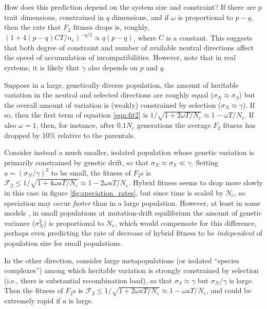 \documentclass{article}
\newcommand{\plr}[1]{\todo[color=blue!25]{#1}}
\newcommand{\plr}[1]{{\color{blue}\it #1}}
\newcommand{\1}{\mathbbm{1}}
\newcommand{\fit}{\mathcal{F}}
\begin{document}
How does this prediction depend on the system size and constraint?
If there are $p$ trait dimensions, constrained in $q$ dimensions,
and if $\omega$ is proportional to $p-q$,
then the rate that $F_2$ fitness drops is, roughly,
$(1 + 4 (p-q) C T/n_e)^{-q/2} \propto q (p-q)$, where $C$ is a constant.
This suggests that both degree of constraint and number of available neutral directions
affect the speed of accumulation of incompatibilities.
However, note that in real systems, it is likely that $\gamma$ also depends on $p$ and $q$.
\plr{revisit with sims}

Suppose in a large, genetically diverse population,
the amount of heritable variation in the neutral and selected directions are roughly equal 
($\sigma_N \approx \sigma_S$)
but the overall amount of variation is (weakly) constrained by selection
($\sigma_N \approx \gamma$).
If so, then the first term of equation \eqref{eqn:fit2} is
$1/\sqrt{1 + 2 \omega T/N_e} \approx 1 - \omega T/N_e$.
If also $\omega=1$, then, for instance, after $0.1 N_e$ generations
the average $F_2$ fitness has dropped by 10\% relative to the parentals.

Consider instead a much smaller, isolated population
whose genetic variation is primarily constrained by genetic drift,
so that $\sigma_N \approx \sigma_S \ll \gamma$.
Setting $a = (\sigma_N/\gamma)^2$ to be small,
the fitness of $F_2$s is $\fit_2 \le 1/\sqrt{1 + 4 \omega a T/N_e} \approx 1 - 2 \omega a T/N_e$.
Hybrid fitness seems to drop more slowly in this case in figure \ref{fig:speciation_rates},
but since time is scaled by $N_e$, so speciation may occur \emph{faster} than in a large population.
However, at least in some models \citep{bartonXXX}, in small populations at mutation-drift equilibrium
the amount of genetic variance ($\sigma_N^2$) is proportional to $N_e$,
which would compensate for this difference, 
perhaps even predicting the rate of decrease of hybrid fitness to be \emph{independent} of population size
for small populations.

In the other direction, consider large metapopulations (or isolated ``species complexes'')
among which heritable variation is strongly constrained by selection
(i.e., there is substantial recombination load),
so that $\sigma_S \approx \gamma$ but $\sigma_N/\gamma$ is large.
Then the fitness of $F_2$s is $\fit_2 \le 1/\sqrt{1 + 2 \omega a T/N_e} \approx 1 - \omega a T/N_e$,
and could be extremely rapid if $a$ is large.
\end{document}
